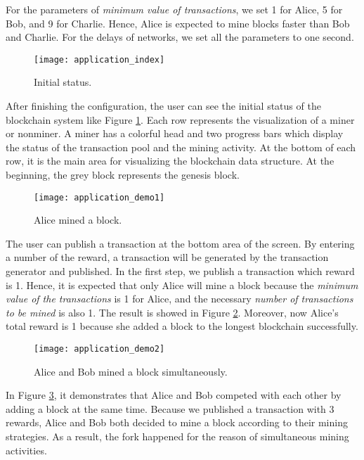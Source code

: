 For the parameters of \textit{minimum value of transactions}, we set 1 for Alice, 5 for Bob, and 9 for Charlie. Hence, Alice is expected to mine blocks faster than Bob and Charlie. For the delays of networks, we set all the parameters to one second.

\begin{figure}[htb]
    \centering
    \texttt{[image: application\_index]}
    \caption{Initial status.}
    \label{fig:initial status}
\end{figure}

After finishing the configuration, the user can see the initial status of the blockchain system like Figure \ref{fig:initial status}. Each row represents the visualization of a miner or nonminer. A miner has a colorful head and two progress bars which display the status of the transaction pool and the mining activity. At the bottom of each row, it is the main area for visualizing the blockchain data structure. At the beginning, the grey block represents the genesis block.

\begin{figure}[htb]
    \centering
    \texttt{[image: application\_demo1]}
    \caption{Alice mined a block.}
    \label{fig:alice mined a block}
\end{figure}

The user can publish a transaction at the bottom area of the screen. By entering a number of the reward, a transaction will be generated by the transaction generator and published. In the first step, we publish a transaction which reward is 1. Hence, it is expected that only Alice will mine a block because the \textit{minimum value of the transactions} is 1 for Alice, and the necessary \textit{number of transactions to be mined} is also 1. The result is showed in Figure \ref{fig:alice mined a block}. Moreover, now Alice's total reward is 1 because she added a block to the longest blockchain successfully.

\begin{figure}[htb]
    \centering
    \texttt{[image: application\_demo2]}
    \caption{Alice and Bob mined a block simultaneously.}
    \label{fig:alice and bob mined a block simultaneously}
\end{figure}

In Figure \ref{fig:alice and bob mined a block simultaneously}, it demonstrates that Alice and Bob competed with each other by adding a block at the same time. Because we published a transaction with 3 rewards, Alice and Bob both decided to mine a block according to their mining strategies. As a result, the fork happened for the reason of simultaneous mining activities.

